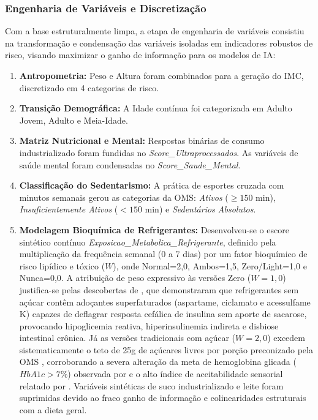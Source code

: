\documentclass[12pt, a4paper]{article}
\begin{document}
    \subsubsection{Engenharia de Variáveis e Discretização}
    Com a base estruturalmente limpa, a etapa de engenharia de variáveis consistiu na transformação e condensação das variáveis isoladas em indicadores robustos de risco, visando maximizar o ganho de informação para os modelos de IA:
    \begin{enumerate}
        \item \textbf{Antropometria:} Peso e Altura foram combinados para a geração do IMC, discretizado em 4 categorias de risco.
        \item \textbf{Transição Demográfica:} A Idade contínua foi categorizada em Adulto Jovem, Adulto e Meia-Idade.
        \item \textbf{Matriz Nutricional e Mental:} Respostas binárias de consumo industrializado foram fundidas no \textit{Score\_Ultraprocessados}. As variáveis de saúde mental foram condensadas no \textit{Score\_Saude\_Mental}.
        \item \textbf{Classificação do Sedentarismo:} A prática de esportes cruzada com minutos semanais gerou as categorias da OMS: \textit{Ativos} ($\ge 150$ min), \textit{Insuficientemente Ativos} ($< 150$ min) e \textit{Sedentários Absolutos}.
        \item \textbf{Modelagem Bioquímica de Refrigerantes:} Desenvolveu-se o escore sintético contínuo \textit{Exposicao\_Metabolica\_Refrigerante}, definido pela multiplicação da frequência semanal (0 a 7 dias) por um fator bioquímico de risco lipídico e tóxico ($W$), onde Normal=2,0, Ambos=1,5, Zero/Light=1,0 e Nunca=0,0. A atribuição de peso expressivo às versões Zero ($W=1,0$) justifica-se pelas descobertas de \cite{campos2023investigacao}, que demonstraram que refrigerantes sem açúcar contêm adoçantes superfaturados (aspartame, ciclamato e acessulfame K) capazes de deflagrar resposta cefálica de insulina sem aporte de sacarose, provocando hipoglicemia reativa, hiperinsulinemia indireta e disbiose intestinal crônica. Já as versões tradicionais com açúcar ($W=2,0$) excedem sistematicamente o teto de 25g de açúcares livres por porção preconizado pela OMS \cite{campos2023investigacao}, corroborando a severa alteração da meta de hemoglobina glicada ($HbA1c > 7\%$) observada por \cite{reis2020associacao} e o alto índice de aceitabilidade sensorial relatado por \cite{ciccone2019aceitabilidade}. Variáveis sintéticas de suco industrializado e leite foram suprimidas devido ao fraco ganho de informação e colinearidades estruturais com a dieta geral.

\end{enumerate}
\end{document}

